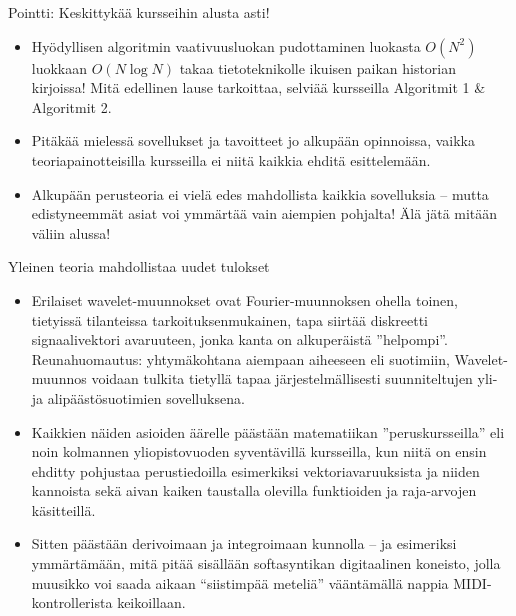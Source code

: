 \documentclass[pdf,9pt,handout]{beamer}
\begin{document}
\begin{frame}{Pointti: Keskittykää kursseihin alusta asti!}
\begin{itemize}
\item
  Hyödyllisen algoritmin vaativuusluokan pudottaminen luokasta
  $O(N^2)$ luokkaan $O(N \mathop{log} N)$ takaa tietoteknikolle
  ikuisen paikan historian kirjoissa! Mitä edellinen lause tarkoittaa,
  selviää kursseilla Algoritmit 1 \& Algoritmit 2.
\item
  Pitäkää mielessä sovellukset ja tavoitteet jo alkupään opinnoissa,
  vaikka teoriapainotteisilla kursseilla ei niitä kaikkia ehditä
  esittelemään.
\item Alkupään perusteoria ei vielä edes mahdollista kaikkia
  sovelluksia -- mutta edistyneemmät asiat voi ymmärtää vain aiempien
  pohjalta! Älä jätä mitään väliin alussa!
\end{itemize}
\end{frame}

\begin{frame}{Yleinen teoria mahdollistaa uudet tulokset}
\begin{itemize}
\item
  Erilaiset wavelet-muunnokset \cite{daubechies1990wavelet} ovat
  Fourier-muunnoksen ohella toinen, tietyissä tilanteissa
  tarkoituksenmukainen, tapa siirtää diskreetti signaalivektori
  avaruuteen, jonka kanta on alkuperäistä
  ''helpompi''. Reunahuomautus: yhtymäkohtana aiempaan aiheeseen eli
  suotimiin, Wavelet-muunnos voidaan tulkita tietyllä tapaa
  järjestelmällisesti suunniteltujen yli- ja alipäästösuotimien
  sovelluksena.
\item
  Kaikkien näiden asioiden äärelle päästään matematiikan
  ''peruskursseilla'' eli noin kolmannen yliopistovuoden syventävillä
  kursseilla, kun niitä on ensin ehditty pohjustaa perustiedoilla
  esimerkiksi vektoriavaruuksista ja niiden kannoista sekä aivan
  kaiken taustalla olevilla funktioiden ja raja-arvojen käsitteillä.
\item Sitten päästään derivoimaan ja integroimaan kunnolla -- ja
  esimeriksi ymmärtämään, mitä pitää sisällään softasyntikan
  digitaalinen koneisto, jolla muusikko voi saada aikaan ``siistimpää
  meteliä'' vääntämällä nappia MIDI-kontrollerista keikoillaan.
\end{itemize}
\end{frame}
\end{document}
